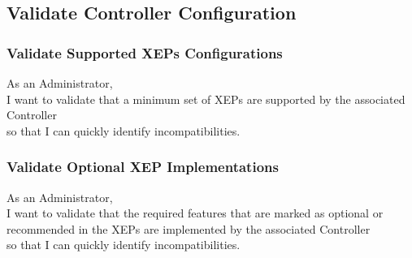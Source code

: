 \subsection{Validate Controller Configuration}

\subsubsection{Validate Supported XEPs Configurations}
As an Administrator,\\
I want to validate that a minimum set of XEPs are supported by the associated Controller\\
so that I can quickly identify incompatibilities.

\subsubsection{Validate Optional XEP Implementations}
As an Administrator,\\
I want to validate that the required features that are marked as optional or recommended in the XEPs are implemented by the associated Controller\\
so that I can quickly identify incompatibilities.

